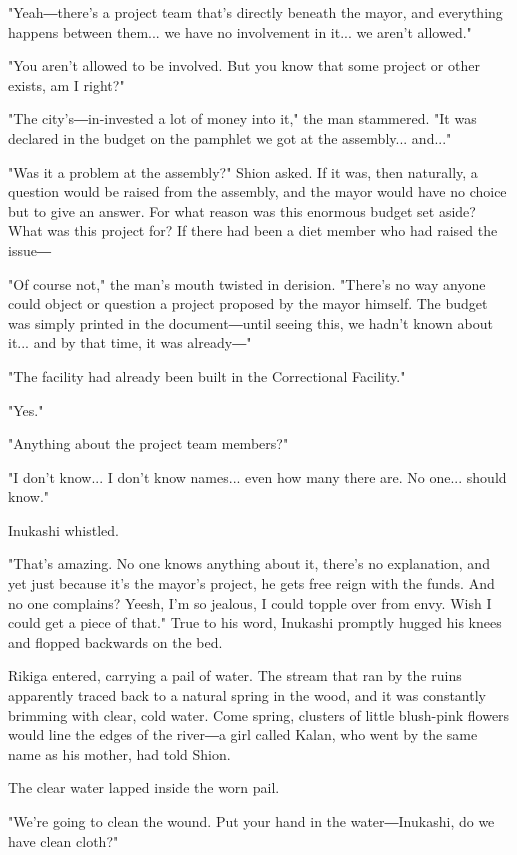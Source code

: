 "Yeah―there's a project team that's directly beneath the mayor, and
everything happens between them... we have no involvement in it... we
aren't allowed."

"You aren't allowed to be involved. But you know that some project or
other exists, am I right?"

"The city's―in-invested a lot of money into it," the man stammered. "It
was declared in the budget on the pamphlet we got at the assembly...
and..."

"Was it a problem at the assembly?" Shion asked. If it was, then
naturally, a question would be raised from the assembly, and the mayor
would have no choice but to give an answer. For what reason was this
enormous budget set aside? What was this project for? If there had been
a diet member who had raised the issue―

"Of course not," the man's mouth twisted in derision. "There's no way
anyone could object or question a project proposed by the mayor himself.
The budget was simply printed in the document―until seeing this, we
hadn't known about it... and by that time, it was already―"

"The facility had already been built in the Correctional Facility."

"Yes."

"Anything about the project team members?"

"I don't know... I don't know names... even how many there are. No
one... should know."

Inukashi whistled.

"That's amazing. No one knows anything about it, there's no explanation,
and yet just because it's the mayor's project, he gets free reign with
the funds. And no one complains? Yeesh, I'm so jealous, I could topple
over from envy. Wish I could get a piece of that." True to his word,
Inukashi promptly hugged his knees and flopped backwards on the bed.

Rikiga entered, carrying a pail of water. The stream that ran by the
ruins apparently traced back to a natural spring in the wood, and it was
constantly brimming with clear, cold water. Come spring, clusters of
little blush-pink flowers would line the edges of the river―a girl
called Kalan, who went by the same name as his mother, had told Shion.

The clear water lapped inside the worn pail.

"We're going to clean the wound. Put your hand in the water―Inukashi, do
we have clean cloth?"

